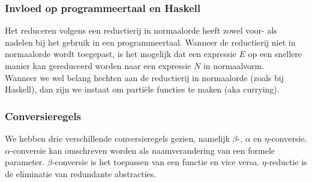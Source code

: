 \subsubsection*{Invloed op programmeertaal en Haskell}

Het reduceren volgens een reductierij in normaalorde heeft zowel voor- als nadelen bij het gebruik in een programmeertaal. Wanneer de reductierij niet in normaalorde wordt toegepast, is het mogelijk dat een expressie $E$ op een snellere manier kan gereduceerd worden naar een expressie $N$ in normaalvorm.\\

Wanneer we wel belang hechten aan de reductierij in normaalorde (zoals bij Haskell), dan zijn we instaat om parti\"ele functies te maken (aka currying).

\subsubsection*{Conversieregels}

We hebben drie verschillende conversieregels gezien, namelijk $\beta$-, $\alpha$ en $\eta$-conversie. $\alpha$-conversie kan omschreven worden als naamverandering van een formele parameter. $\beta$-conversie is het toepassen van een functie en vice versa. $\eta$-reductie is de eliminatie van redundante abstracties.
